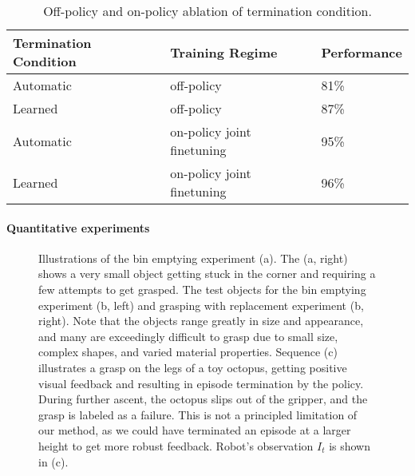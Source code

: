 \documentclass{article}
\begin{document}
\begin{table}[h]
\label{table:termination-ablation}
\begin{center}
\begin{tabular}{|p{12em}|p{9em}|p{7em}|}
\hline
Termination Condition & Training Regime & Performance  \\
\hline
Automatic & off-policy & 81\% \\ 
\hline
Learned & off-policy & 87\% \\ 
\hline
Automatic & on-policy joint finetuning & 95\% \\ 
\hline
Learned & on-policy joint finetuning & 96\% \\ 
\hline
\end{tabular}
\end{center}
\caption{Off-policy and on-policy ablation of termination condition.}
\vspace{-0.25in}
\end{table}\paragraph{Quantitative experiments}\begin{figure}[h]
    \vspace{-0.05in}
    \centering
    \begin{imgrows}
        \imgrow {}
        \imgrow {}
        \imgrow {}
    \end{imgrows}
    \caption{Illustrations of the bin emptying experiment (a). The (a, right) shows a very small object getting stuck in the corner and requiring a few attempts to get grasped. The test objects for the bin emptying experiment (b, left) and grasping with replacement experiment (b, right). Note that the objects range greatly in size and appearance, and many are exceedingly difficult to grasp due to small size, complex shapes, and varied material properties. Sequence (c) illustrates a grasp on the legs of a toy octopus, %
    getting positive visual feedback and resulting in episode termination by the policy. During further ascent, the octopus slips out of the gripper, and the grasp is labeled as a failure. This is not a principled limitation of our method, as we could have terminated an episode at a larger height to get more robust feedback. Robot's observation $I_t$ is shown in (c).}
    \label{fig:bin_unloading}
    \vspace{-0.2in}
\end{figure}
\end{document}
